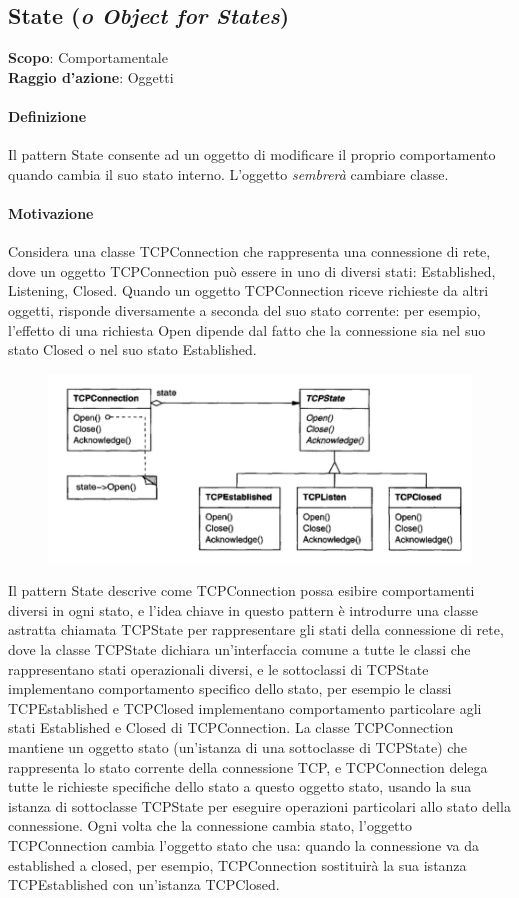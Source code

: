 \subsection{State (\textit{o Object for States})}
\label{state}

\textbf{Scopo}: Comportamentale \\
\textbf{Raggio d'azione}: Oggetti

\paragraph{Definizione} Il pattern State consente ad un oggetto di modificare il proprio comportamento quando cambia il suo stato interno. L'oggetto \textit{sembrerà} cambiare classe.

\paragraph{Motivazione} Considera una classe TCPConnection che rappresenta una connessione di rete, dove un oggetto TCPConnection può essere in uno di diversi stati: Established, Listening, Closed. Quando un oggetto TCPConnection riceve richieste da altri oggetti, risponde diversamente a seconda del suo stato corrente: per esempio, l'effetto di una richiesta Open dipende dal fatto che la connessione sia nel suo stato Closed o nel suo stato Established. 

\begin{figure}[H]
    \centering
    \includegraphics[width=0.75\linewidth]{assets/pattern/state/state-esempio.png}
\end{figure}

Il pattern State descrive come TCPConnection possa esibire comportamenti diversi in ogni stato, e l'idea chiave in questo pattern è introdurre una classe astratta chiamata TCPState per rappresentare gli stati della connessione di rete, dove la classe TCPState dichiara un'interfaccia comune a tutte le classi che rappresentano stati operazionali diversi, e le sottoclassi di TCPState implementano comportamento specifico dello stato, per esempio le classi TCPEstablished e TCPClosed implementano comportamento particolare agli stati Established e Closed di TCPConnection. La classe TCPConnection mantiene un oggetto stato (un'istanza di una sottoclasse di TCPState) che rappresenta lo stato corrente della connessione TCP, e TCPConnection delega tutte le richieste specifiche dello stato a questo oggetto stato, usando la sua istanza di sottoclasse TCPState per eseguire operazioni particolari allo stato della connessione. Ogni volta che la connessione cambia stato, l'oggetto TCPConnection cambia l'oggetto stato che usa: quando la connessione va da established a closed, per esempio, TCPConnection sostituirà la sua istanza TCPEstablished con un'istanza TCPClosed.

